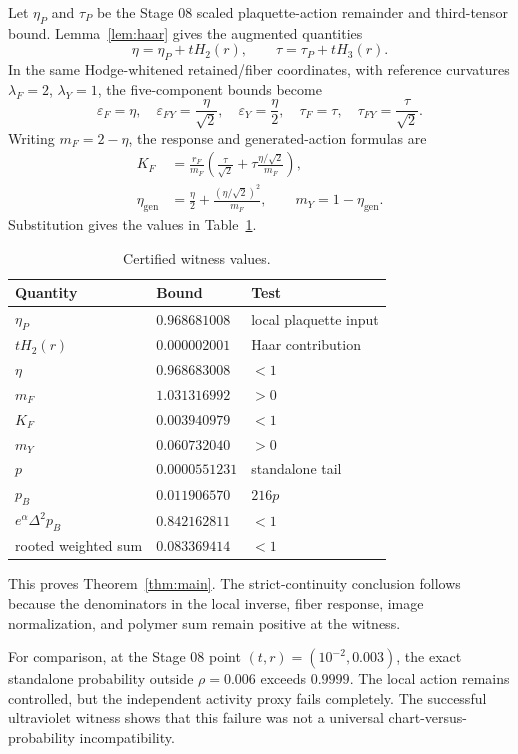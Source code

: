 \documentclass[11pt]{article}
\theoremstyle{definition}
\begin{document}
Let $\eta_P$ and $\tau_P$ be the Stage 08 scaled plaquette-action remainder
and third-tensor bound.  Lemma~\ref{lem:haar} gives the augmented quantities
\[
 \eta=\eta_P+tH_2(r),\qquad \tau=\tau_P+tH_3(r).
\]
In the same Hodge-whitened retained/fiber coordinates, with reference
curvatures $\lambda_F=2$, $\lambda_Y=1$, the five-component bounds become
\[
 \varepsilon_F=\eta,\quad
 \varepsilon_{FY}=\frac{\eta}{\sqrt2},\quad
 \varepsilon_Y=\frac\eta2,\quad
 \tau_F=\tau,\quad \tau_{FY}=\frac\tau{\sqrt2}.
\]
Writing $m_F=2-\eta$, the response and generated-action formulas are
\begin{align*}
 K_F&=\frac{r_F}{m_F}
 \left(\frac{\tau}{\sqrt2}
 +\tau\frac{\eta/\sqrt2}{m_F}\right),\\
 \eta_{\mathrm{gen}}&=\frac\eta2+
 \frac{(\eta/\sqrt2)^2}{m_F},
 \qquad m_Y=1-\eta_{\mathrm{gen}}.
\end{align*}
Substitution gives the values in Table~\ref{tab:witness}.

\begin{table}[ht]
\centering
\caption{Certified witness values.}\label{tab:witness}
\begin{tabular}{@{}lll@{}}
\toprule
Quantity & Bound & Test \\
\midrule
$\eta_P$ & $0.968681008$ & local plaquette input \\
$tH_2(r)$ & $0.000002001$ & Haar contribution \\
$\eta$ & $0.968683008$ & $<1$ \\
$m_F$ & $1.031316992$ & $>0$ \\
$K_F$ & $0.003940979$ & $<1$ \\
$m_Y$ & $0.060732040$ & $>0$ \\
$p$ & $0.0000551231$ & standalone tail \\
$p_B$ & $0.011906570$ & $216p$ \\
$e^\alpha\Delta^2p_B$ & $0.842162811$ & $<1$ \\
rooted weighted sum & $0.083369414$ & $<1$ \\
\bottomrule
\end{tabular}
\end{table}

This proves Theorem~\ref{thm:main}.  The strict-continuity conclusion follows
because the denominators in the local inverse, fiber response, image
normalization, and polymer sum remain positive at the witness.

For comparison, at the Stage 08 point $(t,r)=(10^{-2},0.003)$, the exact
standalone probability outside $\rho=0.006$ exceeds $0.9999$.  The local
action remains controlled, but the independent activity proxy fails
completely.  The successful ultraviolet witness shows that this failure was
not a universal chart-versus-probability incompatibility.
\end{document}
